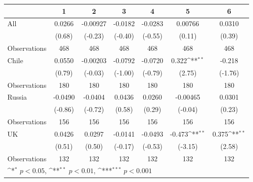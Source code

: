 \def\sym#1{\ifmmode^{#1}\else\(^{#1}\)\fi}
\begin{tabular}{lcccccc}
\hline\hline
&1&2&3&4&5&6\\
\hline
All                 &      0.0266         &    -0.00927         &     -0.0182         &     -0.0283         &     0.00766         &      0.0310         \\
                    &      (0.68)         &     (-0.23)         &     (-0.40)         &     (-0.55)         &      (0.11)         &      (0.39)         \\
\hline
Observations        &         468         &         468         &         468         &         468         &         468         &         468         \\
\hline
\hline
Chile               &      0.0550         &    -0.00203         &     -0.0792         &     -0.0720         &       0.322\sym{**} &      -0.218         \\
                    &      (0.79)         &     (-0.03)         &     (-1.00)         &     (-0.79)         &      (2.75)         &     (-1.76)         \\
\hline
Observations        &         180         &         180         &         180         &         180         &         180         &         180         \\
\hline
\hline
Russia              &     -0.0490         &     -0.0404         &      0.0436         &      0.0260         &    -0.00465         &      0.0301         \\
                    &     (-0.86)         &     (-0.72)         &      (0.58)         &      (0.29)         &     (-0.04)         &      (0.23)         \\
\hline
Observations        &         156         &         156         &         156         &         156         &         156         &         156         \\
\hline
\hline
UK                  &      0.0426         &      0.0297         &     -0.0141         &     -0.0493         &      -0.473\sym{**} &       0.375\sym{**} \\
                    &      (0.51)         &      (0.50)         &     (-0.17)         &     (-0.53)         &     (-3.15)         &      (2.58)         \\
\hline
Observations        &         132         &         132         &         132         &         132         &         132         &         132         \\
\hline
\multicolumn{7}{l}{\footnotesize \sym{*} \(p<0.05\), \sym{**} \(p<0.01\), \sym{***} \(p<0.001\)}\\
\end{tabular}